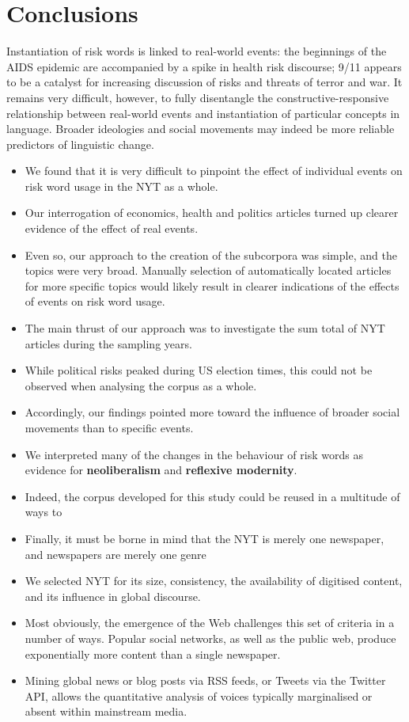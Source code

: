 \section{Conclusions}

    Instantiation of risk words is linked to real-world events: the beginnings of the AIDS epidemic are accompanied by a spike in health risk discourse; 9\slash 11 appears to be a catalyst for increasing discussion of risks and threats of terror and war. It remains very difficult, however, to fully disentangle the constructive-responsive relationship between real-world events and instantiation of particular concepts in language. Broader ideologies and social movements may indeed be more reliable predictors of linguistic change.

    \begin{itemize}
    \item We found that it is very difficult to pinpoint the effect of individual events on risk word usage in the NYT as a whole.
        \item Our interrogation of economics, health and politics articles turned up clearer evidence of the effect of real events.
        \item Even so, our approach to the creation of the subcorpora was simple, and the topics were very broad. Manually selection of automatically located articles for more specific topics would likely result in clearer indications of the effects of events on risk word usage.
        \item The main thrust of our approach was to investigate the sum total of NYT articles during the sampling years.
        \item While political risks peaked during US election times, this could not be observed when analysing the corpus as a whole.
        \item Accordingly, our findings pointed more toward the influence of broader social movements than to specific events.
        \item We interpreted many of the changes in the behaviour of risk words as evidence for \textbf{neoliberalism} and \textbf{reflexive modernity}.
        \item Indeed, the corpus developed for this study could be reused in a multitude of ways to 
        \item Finally, it must be borne in mind that the NYT is merely one newspaper, and newspapers are merely one genre
        \item We selected NYT for its size, consistency, the availability of digitised content, and its influence in global discourse.
        \item Most obviously, the emergence of the Web challenges this set of criteria in a number of ways. Popular social networks, as well as the public web, produce exponentially more content than a single newspaper.
        \item Mining global news or blog posts via RSS feeds, or Tweets via the Twitter API, allows the quantitative analysis of voices typically marginalised or absent within mainstream media.
    \end{itemize}
    
%